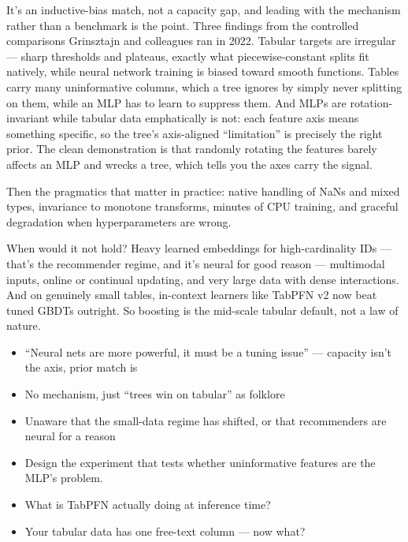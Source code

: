 \documentclass[10pt,twoside]{book}
\newcommand{\lab}[1]{\par\vspace{5pt}\noindent{\sffamily\footnotesize\bfseries\color{accent}#1}\par\vspace{1pt}}
\newcommand{\flab}[1]{\par\vspace{5pt}\noindent{\sffamily\footnotesize\bfseries\color{flag}#1}\par\vspace{1pt}}
\begin{document}
It's an inductive-bias match, not a capacity gap, and leading with the mechanism rather than a benchmark is the point. Three findings from the controlled comparisons Grinsztajn and colleagues ran in 2022. Tabular targets are irregular --- sharp thresholds and plateaus, exactly what piecewise-constant splits fit natively, while neural network training is biased toward smooth functions. Tables carry many uninformative columns, which a tree ignores by simply never splitting on them, while an MLP has to learn to suppress them. And MLPs are rotation-invariant while tabular data emphatically is not: each feature axis means something specific, so the tree's axis-aligned ``limitation'' is precisely the right prior. The clean demonstration is that randomly rotating the features barely affects an MLP and wrecks a tree, which tells you the axes carry the signal.\par\vspace{3pt}
Then the pragmatics that matter in practice: native handling of NaNs and mixed types, invariance to monotone transforms, minutes of CPU training, and graceful degradation when hyperparameters are wrong.\par\vspace{3pt}
When would it not hold? Heavy learned embeddings for high-cardinality IDs --- that's the recommender regime, and it's neural for good reason --- multimodal inputs, online or continual updating, and very large data with dense interactions. And on genuinely small tables, in-context learners like TabPFN v2 now beat tuned GBDTs outright. So boosting is the mid-scale tabular default, not a law of nature.\par\vspace{3pt}
\flab{Loses the signal}
\begin{itemize}
\item ``Neural nets are more powerful, it must be a tuning issue'' --- capacity isn't the axis, prior match is
\item No mechanism, just ``trees win on tabular'' as folklore
\item Unaware that the small-data regime has shifted, or that recommenders are neural for a reason
\end{itemize}
\lab{Then they ask}
\begin{itemize}
\item Design the experiment that tests whether uninformative features are the MLP's problem.
\item What is TabPFN actually doing at inference time?
\item Your tabular data has one free-text column --- now what?
\end{itemize}
\end{document}

